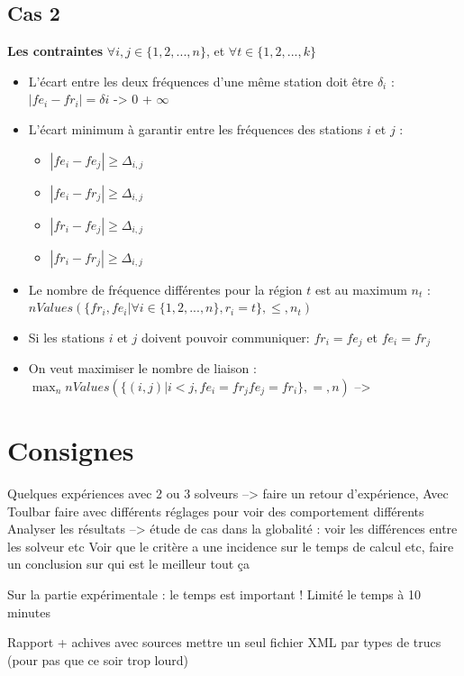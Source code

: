 \documentclass[a4paper, 10pt]{article}
\begin{document}
  \subsection{Cas 2 }

    \textbf{Les contraintes} $\forall i,j \in \{1,2,...,n \}$, et $\forall t \in \{1,2,...,k\}$
    \begin{itemize}
      \item L'écart entre les deux fréquences d'une même station doit être $\delta_{i}$ :
       $| fe_{i} - fr_{i} | = \delta{i}$ -> \color{green} 0 \color{red} + $\infty$ \color{black}
      \item L'écart minimum à garantir entre les fréquences des stations $i$ et $j$ :
      \begin{itemize}
        \item $| fe_i - fe_j | \geq \Delta_{i,j}$
        \item $| fe_i - fr_j | \geq \Delta_{i,j}$
        \item $| fr_i - fe_j | \geq \Delta_{i,j}$
        \item $| fr_i - fr_j | \geq \Delta_{i,j}$
      \end{itemize}
      \item Le nombre de fréquence différentes pour la région $t$ est au maximum $n_t$ : $nValues(\{fr_{i}, fe_{i} | \forall i \in \{1,2,...,n \}, r_{i} = t \}, \leq, n_{t})$
      \item Si les stations $i$ et $j$ doivent pouvoir communiquer:
      $fr_i = fe_j$ et $fe_i = fr_j$
      \item On veut maximiser le nombre de liaison :  $\displaystyle{ \max_{n} nValues(\{ (i,j) | i<j, fe_i = fr_j fe_j = fr_i \}, =,n)}$ -->
  \end{itemize}

  \section{Consignes}

  Quelques expériences avec 2 ou 3 solveurs --> faire un retour d'expérience,
  Avec Toulbar faire avec différents réglages pour voir des comportement différents
  Analyser les résultats --> étude de cas dans la globalité : voir les différences entre les solveur etc Voir que le critère a une incidence sur le temps de calcul etc, faire un conclusion sur qui est le meilleur tout ça

  Sur la partie expérimentale : le temps est important ! Limité le temps à 10 minutes

  Rapport + achives avec sources mettre un seul fichier XML par types de trucs (pour pas que ce soir trop lourd)
\end{document}
